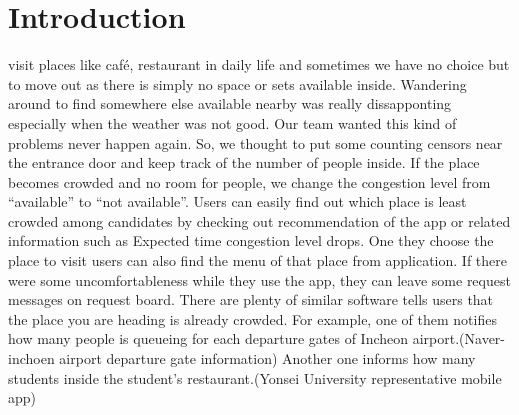 \documentclass[journal]{IEEEtran}
\begin{document}
\section{Introduction}

 visit places like café, restaurant in daily life and sometimes we have no choice but to move out as there is simply no space or sets available inside. Wandering around to find somewhere else available nearby was really dissapponting especially when the weather was not good.
Our team wanted this kind of problems never happen again. So, we thought to put some counting censors near the entrance door and keep track of the number of people inside. If the place becomes crowded and no room for people, we change the congestion level from “available” to “not available”. Users can easily find out which place is least crowded among candidates by checking out recommendation of the app or related information such as Expected time congestion level drops. One they choose the place to visit users can also find the menu of that place from application. If there were some uncomfortableness while they use the app, they can leave some request messages on request board.   
	There are plenty of similar software tells users that the place you are heading is already crowded. For example, one of them notifies how many people is queueing for each departure gates of Incheon airport.(Naver- inchoen airport departure gate information) Another one informs how many students inside the student’s restaurant.(Yonsei University representative mobile app) 




\end{document}
